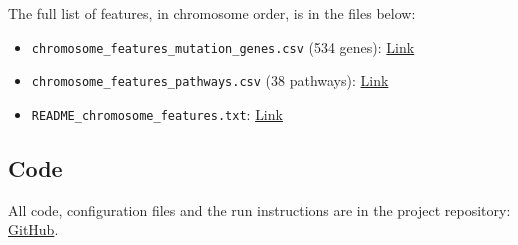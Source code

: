 \begin{appendices}
The full list of features, in chromosome order, is in the files below:

\begin{itemize}
  \item \texttt{chromosome\_features\_mutation\_genes.csv} (534 genes): \href{https://drive.google.com/file/d/1ba-mnUhJxmIIog-WZMatWdbVAE-Zwoh8/view?usp=drive_link}{Link}
  \item \texttt{chromosome\_features\_pathways.csv} (38 pathways): \href{https://drive.google.com/file/d/1ucFABj0zOMYXg7lMVOGzzt2E3JNwWa-T/view?usp=drive_link}{Link}
  \item \texttt{README\_chromosome\_features.txt}: \href{https://drive.google.com/file/d/1DHbwAa4ZrXldvbWXHumVmMFg0RpIrbvL/view?usp=drive_link}{Link}
\end{itemize}

\subsection{Code}
\label{app:data-code}

All code, configuration files and the run instructions are in the project repository: \href{https://github.com/HawaIbr01/COS700-XAI-In-Cancer-Medicine-Treatment}{GitHub}.

\end{appendices}